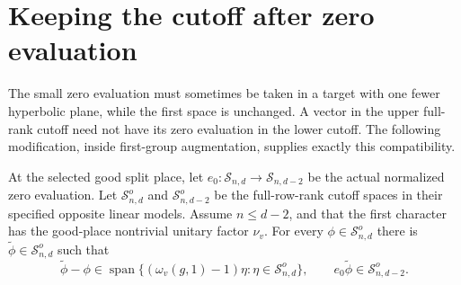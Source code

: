 
\section{Keeping the cutoff after zero evaluation}
\label{sec:sr-theta-simultaneous-cutoff}

The small zero evaluation must sometimes be taken in a target with one
fewer hyperbolic plane, while the first space is unchanged. A vector
in the upper full-rank cutoff need not have its zero evaluation in the
lower cutoff. The following modification, inside first-group
augmentation, supplies exactly this compatibility.

\begin{srlemma}
\label{lem:sr-theta-simultaneous-cutoff-local}
At the selected good split place, let
\(e_0:\mathcal S_{n,d}\longrightarrow\mathcal S_{n,d-2}\)
be the actual normalized zero evaluation. Let
\(\mathcal S^o_{n,d}\) and \(\mathcal S^o_{n,d-2}\)
be the full-row-rank cutoff spaces in their specified opposite
linear models. Assume \(n\le d-2\), and that the first character
has the good-place nontrivial unitary factor \(\nu_v\).
For every \(\phi\in\mathcal S^o_{n,d}\) there is
\(\widetilde\phi\in\mathcal S^o_{n,d}\) such that
\[
 \widetilde\phi-\phi\in
       \operatorname{span}\{(\omega_v(g,1)-1)\eta:
                      \eta\in\mathcal S^o_{n,d}\},
 \qquad
              e_0\widetilde\phi\in\mathcal S^o_{n,d-2}.
 \tag{Z1}\label{eq:sr-theta-simultaneous-cutoff-local}
\]
\end{srlemma}

